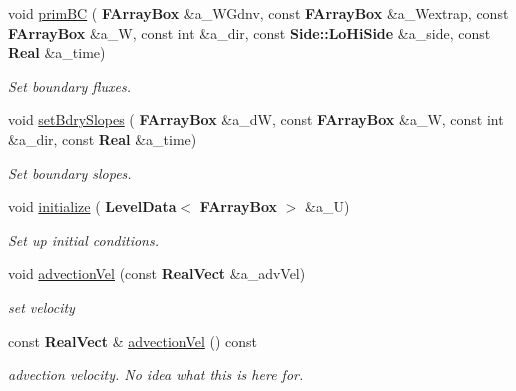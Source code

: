 \begin{DoxyCompactItemize}
\mbox{\label{class_advect_i_b_c_af222561d9fba9498f4fc647a9e37547a}} 
void \hyperlink{class_advect_i_b_c_af222561d9fba9498f4fc647a9e37547a}{prim\+BC} (\textbf{ F\+Array\+Box} \&a\+\_\+\+W\+Gdnv, const \textbf{ F\+Array\+Box} \&a\+\_\+\+Wextrap, const \textbf{ F\+Array\+Box} \&a\+\_\+W, const int \&a\+\_\+dir, const \textbf{ Side\+::\+Lo\+Hi\+Side} \&a\+\_\+side, const \textbf{ Real} \&a\+\_\+time)
\begin{DoxyCompactList}\small\item\em Set boundary fluxes. \end{DoxyCompactList}\item 
void \hyperlink{class_advect_i_b_c_a5410c1910c93274665fe324a5c6b3be9}{set\+Bdry\+Slopes} (\textbf{ F\+Array\+Box} \&a\+\_\+dW, const \textbf{ F\+Array\+Box} \&a\+\_\+W, const int \&a\+\_\+dir, const \textbf{ Real} \&a\+\_\+time)
\begin{DoxyCompactList}\small\item\em Set boundary slopes. \end{DoxyCompactList}\item 
void \hyperlink{class_advect_i_b_c_abd44c883d18c238c99456b57d974f9dc}{initialize} (\textbf{ Level\+Data}$<$ \textbf{ F\+Array\+Box} $>$ \&a\+\_\+U)
\begin{DoxyCompactList}\small\item\em Set up initial conditions. \end{DoxyCompactList}\item 
\mbox{\label{class_advect_i_b_c_ab09d9d22d56f103e39e08884fb4b6217}} 
void \hyperlink{class_advect_i_b_c_ab09d9d22d56f103e39e08884fb4b6217}{advection\+Vel} (const \textbf{ Real\+Vect} \&a\+\_\+adv\+Vel)
\begin{DoxyCompactList}\small\item\em set velocity \end{DoxyCompactList}\item 
\mbox{\label{class_advect_i_b_c_a27ce161a1d4922c19807df199594f385}} 
const \textbf{ Real\+Vect} \& \hyperlink{class_advect_i_b_c_a27ce161a1d4922c19807df199594f385}{advection\+Vel} () const
\begin{DoxyCompactList}\small\item\em advection velocity. No idea what this is here for. \end{DoxyCompactList}\item 

\end{DoxyCompactItemize}

